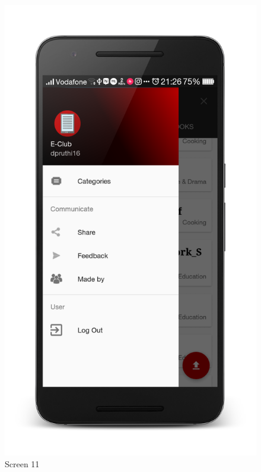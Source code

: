 \begin{figure}[ht]
\centering
\includegraphics[scale=0.1]{images/d9.png}
\caption{Screen 11}
\end{figure}

\newpage

